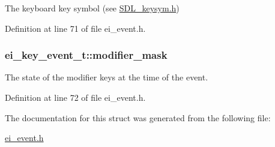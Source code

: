 The keyboard key symbol (see \hyperlink{_s_d_l__keysym_8h}{S\-D\-L\-\_\-keysym.\-h}) 



Definition at line 71 of file ei\-\_\-event.\-h.

\hypertarget{structei__key__event__t_a35e4dc6d788b9fdd4eeedf716662afab}{
\subsubsection[{modifier\-\_\-mask}]{ ei\-\_\-key\-\_\-event\-\_\-t\-::modifier\-\_\-mask}}\label{structei__key__event__t_a35e4dc6d788b9fdd4eeedf716662afab}


The state of the modifier keys at the time of the event. 



Definition at line 72 of file ei\-\_\-event.\-h.



The documentation for this struct was generated from the following file\-:\begin{DoxyCompactItemize}
\item 
\hyperlink{ei__event_8h}{ei\-\_\-event.\-h}\end{DoxyCompactItemize}
